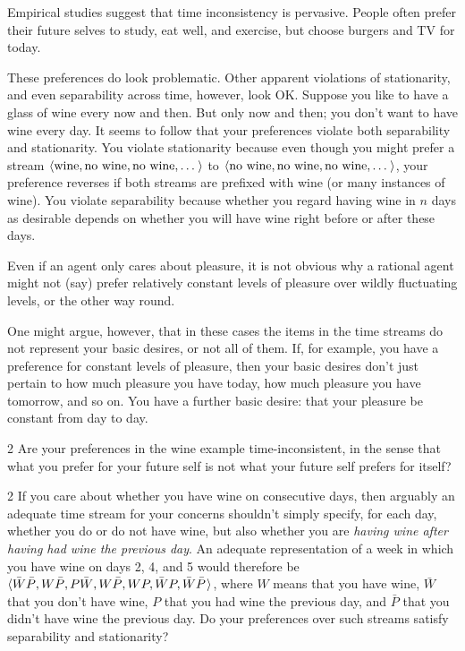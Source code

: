 

Empirical studies suggest that time inconsistency is pervasive. People often
prefer their future selves to study, eat well, and exercise, but choose burgers
and TV for today.

These preferences do look problematic. Other apparent violations of
stationarity, and even separability across time, however, look OK. Suppose you
like to have a glass of wine every now and then. But only now and then; you
don't want to have wine every day. It seems to follow that your preferences
violate both separability and stationarity. You violate stationarity because
even though you might prefer a stream $\t{\text{wine}, \text{no wine}, \text{no
    wine}, \ldots}$ to $\t{\text{no wine}, \text{no wine}, \text{no
    wine}, \ldots}$, your preference reverses if both streams are prefixed with
wine (or many instances of wine). You violate separability because whether you
regard having wine in $n$ days as desirable depends on whether you will have
wine right before or after these days.

Even if an agent only cares about pleasure, it is not obvious why a rational
agent might not (say) prefer relatively constant levels of pleasure over wildly
fluctuating levels, or the other way round.

One might argue, however, that in these cases the items in the time streams do
not represent your basic desires, or not all of them. If, for example, you have a
preference for constant levels of pleasure, then your basic desires don't just
pertain to how much pleasure you have today, how much pleasure you have
tomorrow, and so on. You have a further basic desire: that your pleasure be
constant from day to day.

\begin{exercise}{2}
  Are your preferences in the wine example time-inconsistent, in the sense that
  what you prefer for your future self is not what your future self prefers for
  itself?
\end{exercise}

\begin{exercise}{2}
  If you care about whether you have wine on consecutive days, then arguably an
  adequate time stream for your concerns shouldn't simply specify, for each day,
  whether you do or do not have wine, but also whether you are \emph{having wine
    after having had wine the previous day}. An adequate representation of a
  week in which you have wine on days 2, 4, and 5 would therefore be
  $\t{\bar{W} \bar{P}, W \bar{P}, P \bar{W}, W \bar{P}, W P, \bar{W} P, \bar{W} \bar{P}}$,
  where $W$ means that you have wine, $\bar{W}$ that you don't have wine, $P$
  that you had wine the previous day, and $\bar{P}$ that you didn't have wine
  the previous day. Do your preferences over such streams satisfy separability
  and stationarity?
\end{exercise}


